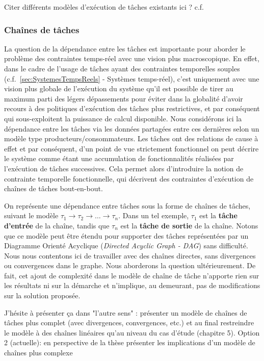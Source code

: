 \documentclass[french, a4paper, 11pt, twoside, pdftex]{StyleThese}
\begin{document}
		\alert{Citer différents modèles d'exécution de tâches existants ici ? c.f. ~\cite{friese_estimating_2018}}
    
    	\subsubsection{Chaînes de tâches}
	    La question de la dépendance entre les tâches est importante pour aborder le problème des contraintes temps-réel avec une vision plus macroscopique. En effet, dans le cadre de l'usage de tâches ayant des contraintes temporelles souples (c.f.~\autoref{sec:SystemesTempsReels} - Systèmes temps-réel), c'est uniquement avec une vision plus globale de l'exécution du système qu'il est possible de tirer au maximum parti des légers dépassements pour éviter dans la globalité d'avoir recours à des politiques d'exécution des tâches plus restrictives, et par conséquent qui sous-exploitent la puissance de calcul disponible.
	    Nous considérons ici la dépendance entre les tâches via les données partagées entre ces dernières selon un modèle type producteurs/consommateurs. Les tâches ont des relations de cause à effet et par conséquent, d'un point de vue strictement fonctionnel on peut décrire le système comme étant une accumulation de fonctionnalités réalisées par l'exécution de tâches successives. Cela permet alors d'introduire la notion de contrainte temporelle fonctionnelle, qui décrivent des contraintes d'exécution de chaînes de tâches bout-en-bout.
	    
	    
	    On représente une dépendance entre tâches sous la forme de chaînes de tâches, suivant le modèle $\tau_{1} \rightarrow \tau_2 \rightarrow \ldots \rightarrow \tau_n$. Dans un tel exemple, $\tau_1$ est la \textbf{tâche d'entrée} de la chaîne, tandis que $\tau_n$ est la \textbf{tâche de sortie} de la chaîne. Notons que ce modèle peut être étendu pour supporter des tâches représentées par un Diagramme Orienté Acyclique (\textit{Directed Acyclic Graph - DAG}) sans difficulté. Nous nous contentons ici de travailler avec des chaînes directes, sans divergences ou convergences dans le graphe. Nous aborderons la question ultérieurement. De fait, cet ajout de complexité dans le modèle de chaîne de tâche n'apporte rien sur les résultats ni sur la démarche et n'implique, au demeurant, pas de modifications sur la solution proposée. 

	    \alert{J'hésite à présenter ça dans "l'autre sens" : présenter un modèle de chaînes de tâches plus complet (avec divergences, convergences, etc.) et au final restreindre le modèle à des chaînes linéaires qu'au niveau du cas d'étude (chapitre 5). Option 2 (actuelle): en perspective de la thèse présenter les implications d'un modèle de chaînes plus complexe}
	    
\end{document}
